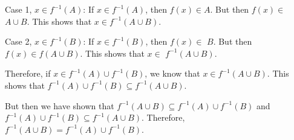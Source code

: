 \documentclass[11pt,letterpaper]{article}
\newcommand{\ansun}[2]{\underline{\hspace{#1}#2\hspace{#1}}} %
\begin{document}
	\hspace{1cm} Case 1, \ansun{0.55cm}{$x \in f^{-1}(A)$}: If $x \in f^{-1}(A)$, then $f(x) \in A$. But then $f(x) \in$ \ansun{0.97cm}{$A \cup B$}. \pspace \hspace{1cm} This shows that $x \in f^{-1}(A \cup B)$. \pvspace{1cm}

	\hspace{1cm} Case 2, $x \in f^{-1}(B)$: If $x \in f^{-1}(B)$, then $f(x) \in$ \ansun{1.32cm}{$B$}. But then $f(x) \in f(A \cup B)$. \pspace \hspace{1cm} This shows that $x \in$ \ansun{0.50cm}{$f^{-1}(A \cup B)$}. 

Therefore, if $x \in f^{-1}(A) \cup f^{-1}(B)$, we know that $x \in f^{-1}(A \cup B)$. This shows that \ansun{0cm}{$f^{-1}(A) \cup f^{-1}(B) \subseteq f^{-1}(A \cup B)$}. 


But then we have shown that \ansun{0cm}{$f^{-1}(A \cup B) \subseteq f^{-1}(A) \cup f^{-1}(B)$} and \ansun{0cm}{$f^{-1}(A) \cup f^{-1}(B) \subseteq f^{-1}(A \cup B)$}. \pspace Therefore, $f^{-1}(A \cup B)= f^{-1}(A) \cup f^{-1}(B)$. 
\end{document}
